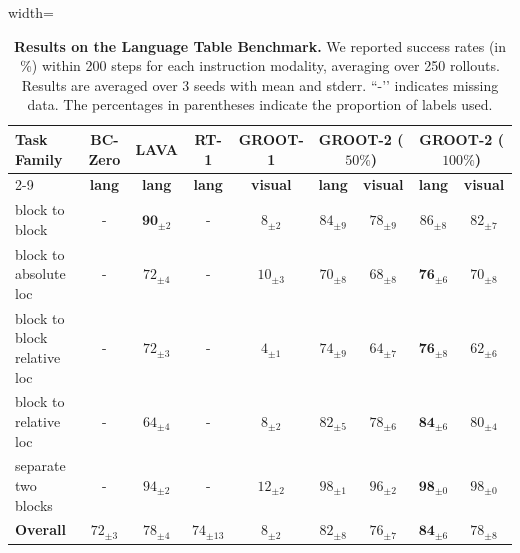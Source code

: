 \begin{table}[t]
\footnotesize
\setlength{\tabcolsep}{1.3 mm}
\centering
\caption{
    \textbf{Results on the Language Table Benchmark.}
    We reported success rates (in \%) within 200 steps for each instruction modality, averaging over 250 rollouts. Results are averaged over 3 seeds with mean and stderr. ``-’’ indicates missing data. The percentages in parentheses indicate the proportion of labels used. 
}  \label{tab:language-table}
\renewcommand{\arraystretch}{1.0}
\begin{adjustbox}{width=\linewidth}
\begin{tabular}{@{}lcccccccc@{}}
\toprule
 \multirow{2}{*}{\textbf{Task Family}}     & \multicolumn{1}{c}{\textbf{BC-Zero}} & \multicolumn{1}{c}{\textbf{LAVA}} & \multicolumn{1}{c}{\textbf{RT-1}} & \multicolumn{1}{c}{\textbf{GROOT-1}} & \multicolumn{2}{c}{\textbf{GROOT-2} ($50\%$)} & \multicolumn{2}{c}{\textbf{GROOT-2} ($100\%$)}   \\ \cmidrule(l){2-9} 
                                 & \multicolumn{1}{c}{\textbf{lang}} & \multicolumn{1}{c}{\textbf{lang}} & \multicolumn{1}{c}{\textbf{lang}} & \multicolumn{1}{c}{\textbf{visual}} & \multicolumn{1}{c}{\textbf{lang}} & \multicolumn{1}{c}{\textbf{visual}} &
                                 \multicolumn{1}{c}{\textbf{lang}} & \multicolumn{1}{c}{\textbf{visual}} \\ \midrule
block to block              & - & $\mathbf{90}_{\pm 2}$ & - & $8_{\pm 2}$  & $84_{\pm 9}$           & $78_{\pm 9}$ & $86_{\pm 8}$ & $82_{\pm 7}$ \\
block to absolute loc       & - & $72_{\pm 4}$ & - & $10_{\pm 3}$ & $70_{\pm 8}$           & $68_{\pm 8}$ & $\mathbf{76}_{\pm 6}$ & $70_{\pm 8}$ \\
block to block relative loc & - & $72_{\pm 3}$          & - & $4_{\pm 1}$  & $74_{\pm 9}$  & $64_{\pm 7}$ & $\mathbf{76}_{\pm 8}$ & $62_{\pm 6}$   \\
block to relative loc       & - & $64_{\pm 4}$          & - & $8_{\pm 2}$  & $82_{\pm 5}$  & $78_{\pm 6}$ & $\mathbf{84}_{\pm 6}$ & $80_{\pm 4}$   \\
separate two blocks         & - & $94_{\pm 2}$          & - & $12_{\pm 2}$ & $98_{\pm 1}$  & $96_{\pm 2}$ & $\mathbf{98}_{\pm 0}$ & $98_{\pm 0}$   \\ \midrule
\textbf{Overall}            & $72_{\pm 3}$ & $78_{\pm 4}$  & $74_{\pm 13}$ & $8_{\pm 2}$ & $82_{\pm 8}$ & $76_{\pm 7}$ & $\mathbf{84}_{\pm 6}$ & $78_{\pm 8}$      \\ \bottomrule
\end{tabular}
\end{adjustbox}
\end{table}


